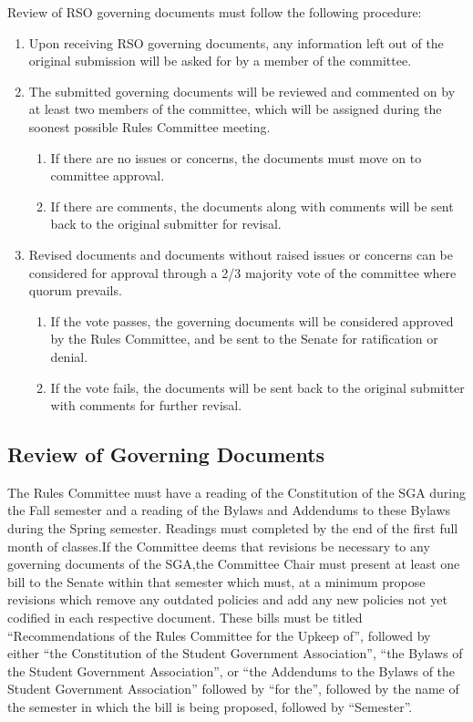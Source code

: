 \documentclass[12pt]{scrreprt}
\begin{document}
Review of RSO governing documents must follow the following procedure:
\begin{enumerate}
    \item Upon receiving RSO governing documents, any information left out of the original
submission will be asked for by a member of the committee.
    \item The submitted governing documents will be reviewed and commented on by at least
two members of the committee, which will be assigned during the soonest possible
Rules Committee meeting.
    \begin{enumerate}
        \item If there are no issues or concerns, the documents must move on to committee approval.
        \item If there are comments, the documents along with comments will be sent back to the original submitter for revisal.
    \end{enumerate}
    \item Revised documents and documents without raised issues or concerns can be
considered for approval through a 2/3 majority vote of the committee where quorum prevails.
    \begin{enumerate}
        \item If the vote passes, the governing documents will be considered approved by the Rules Committee, and be sent to the Senate for ratification or denial.
        \item If the vote fails, the documents will be sent back to the original submitter with comments for further revisal.
     \end{enumerate}
\end{enumerate}


\subsection{Review of Governing Documents}
The Rules Committee must have a reading
of the Constitution of the SGA during the Fall semester and a reading of the Bylaws and
Addendums to these Bylaws during the Spring semester. Readings must completed by the end
of the first full month of classes.If the Committee deems that revisions be necessary to any governing documents of the SGA,the Committee Chair must present at least one bill to the Senate within that semester which must, at a minimum propose revisions which remove any outdated policies and add any new policies not yet codified in each respective document. These bills must be titled “Recommendations of the Rules Committee for the Upkeep of”, followed by either “the Constitution of the Student Government Association”, “the Bylaws of the Student Government Association”, or “the Addendums to the Bylaws of
the Student Government Association” followed by “for the”, followed by the name of the semester in which the bill is being proposed, followed by “Semester”. 
\end{document}
